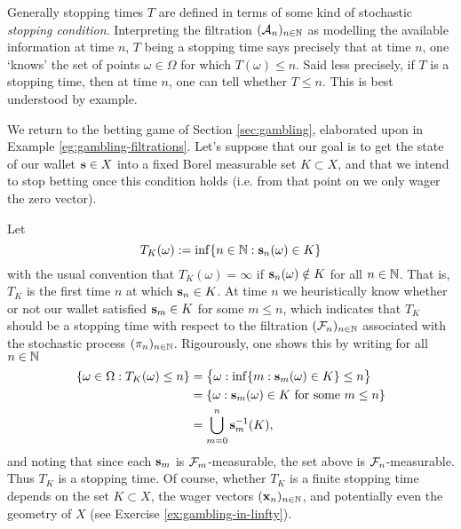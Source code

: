 Generally stopping times $T$ are defined in terms of some kind of stochastic \emph{stopping condition}.
Interpreting the filtration $(\mathcal{A}_n)_{n \in \mathbb{N}}$ as modelling the available information at time $n$, $T$ being a stopping time says precisely that at time $n$, one `knows' the set of points $\omega \in \Omega$ for which $T(\omega) \leq n$.
Said less precisely, if $T$ is a stopping time, then at time $n$, one can tell whether $T \leq n$.
This is best understood by example.

\begin{example}\label{eg:gambling-stoppingtimes}
  We return to the betting game of Section \ref{sec:gambling}, elaborated upon in Example \ref{eg:gambling-filtrations}.
  Let's suppose that our goal is to get the state of our wallet $\mathbf{s} \in X$ into a fixed Borel measurable set $K \subset X$, and that we intend to stop betting once this condition holds (i.e. from that point on we only wager the zero vector).
  
  Let
  \begin{equation*}
    T_K(\omega) := \inf\{n \in \mathbb{N} : \mathbf{s}_n(\omega) \in K \}
  \end{equation*}
  with the usual convention that $T_K(\omega) = \infty$ if $\mathbf{s}_n(\omega) \notin K$ for all $n \in \mathbb{N}$.
  That is, $T_K$ is the first time $n$ at which $\mathbf{s}_n \in K$.
  At time $n$ we heuristically know whether or not our wallet satisfied $\mathbf{s}_m \in K$ for some $m \leq n$, which indicates that $T_K$ should be a stopping time with respect to the filtration $(\mathcal{F}_n)_{n \in \mathbb{N}}$ associated with the stochastic process $(\pi_n)_{n \in \mathbb{N}}$.
  Rigourously, one shows this by writing for all $n \in \mathbb{N}$
  \begin{equation*}
    \begin{aligned}
      \{\omega \in \Omega : T_K(\omega) \leq n\}
      &= \big\{\omega : \inf\{m : \mathbf{s}_m(\omega) \in K\} \leq n\big\} \\
      &= \{\omega  : \text{$\mathbf{s}_m(\omega) \in K$ for some $m \leq n$}\} \\
      &= \bigcup_{m = 0}^n \mathbf{s}_m^{-1}(K),
    \end{aligned}
  \end{equation*}
  and noting that since each $\mathbf{s}_m$ is $\mathcal{F}_m$-measurable, the set above is $\mathcal{F}_n$-measurable.
  Thus $T_K$ is a stopping time.
  Of course, whether $T_K$ is a finite stopping time depends on the set $K \subset X$, the wager vectors $(\mathbf{x}_n)_{n \in \mathbb{N}}$, and potentially even the geometry of $X$ (see Exercise \ref{ex:gambling-in-linfty}).
\end{example}

